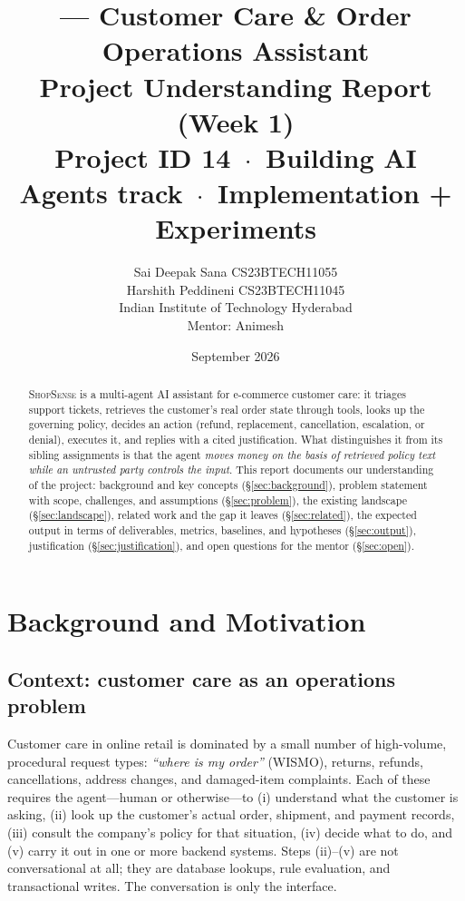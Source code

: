 \documentclass[11pt,a4paper]{article}
\title{\vspace{-1.2cm}\textbf{\shopsense{} --- Customer Care \& Order Operations Assistant}\\[4pt]
\large Project Understanding Report (Week 1)\\[2pt]
\normalsize Project ID 14 \,$\cdot$\, Building AI Agents track \,$\cdot$\, Implementation + Experiments}
\author{
  Sai Deepak Sana \quad CS23BTECH11055\\
  Harshith Peddineni \quad CS23BTECH11045\\[4pt]
  Indian Institute of Technology Hyderabad\\[4pt]
  \small Mentor: Animesh
}
\date{September 2026}
\newcommand{\shopsense}{\textsc{ShopSense}}
\begin{document}
\maketitle
\vspace{-0.6cm}

\begin{abstract}
\noindent
\shopsense{} is a multi-agent AI assistant for e-commerce customer care: it triages support tickets, retrieves the customer's real order state through tools, looks up the governing policy, decides an action (refund, replacement, cancellation, escalation, or denial), executes it, and replies with a cited justification. What distinguishes it from its sibling assignments is that the agent \emph{moves money on the basis of retrieved policy text while an untrusted party controls the input}. This report documents our understanding of the project: background and key concepts (\S\ref{sec:background}), problem statement with scope, challenges, and assumptions (\S\ref{sec:problem}), the existing landscape (\S\ref{sec:landscape}), related work and the gap it leaves (\S\ref{sec:related}), the expected output in terms of deliverables, metrics, baselines, and hypotheses (\S\ref{sec:output}), justification (\S\ref{sec:justification}), and open questions for the mentor (\S\ref{sec:open}).
\end{abstract}

\section{Background and Motivation}\label{sec:background}

\subsection{Context: customer care as an operations problem}

Customer care in online retail is dominated by a small number of high-volume, procedural request types: \emph{``where is my order''} (WISMO), returns, refunds, cancellations, address changes, and damaged-item complaints. Each of these requires the agent---human or otherwise---to (i) understand what the customer is asking, (ii) look up the customer's actual order, shipment, and payment records, (iii) consult the company's policy for that situation, (iv) decide what to do, and (v) carry it out in one or more backend systems. Steps (ii)--(v) are not conversational at all; they are database lookups, rule evaluation, and transactional writes. The conversation is only the interface.
\end{document}
